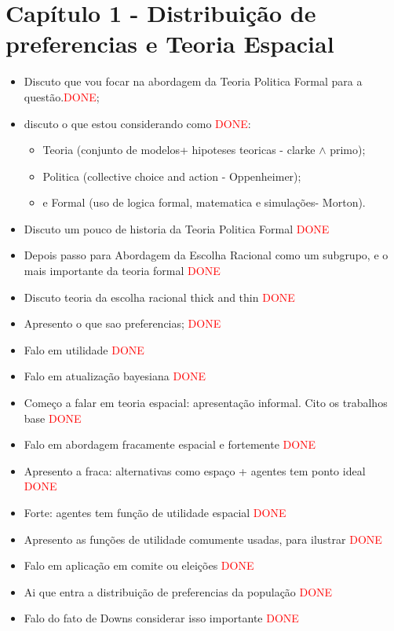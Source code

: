 \documentclass{article}
\begin{document}
\section*{Capítulo 1 - Distribuição de preferencias e Teoria Espacial }
\begin{itemize}
\item Discuto que vou focar na abordagem da Teoria Politica Formal para a
  questão.\textcolor{red}{DONE};
\item discuto o que estou considerando como \textcolor{red}{DONE}:
  \begin{itemize}
  \item Teoria (conjunto de modelos+ hipoteses teoricas - clarke $\land$ primo);
  \item Politica (collective choice and action - Oppenheimer); 
  \item e Formal (uso de logica formal, matematica e simulações- Morton).
\end{itemize}
\item Discuto um pouco de historia da Teoria Politica Formal \textcolor{red}{DONE}
\item Depois  passo para Abordagem da Escolha Racional como um subgrupo, e o
  mais importante da teoria formal \textcolor{red}{DONE}
\item Discuto teoria da escolha racional thick and thin \textcolor{red}{DONE}
\item Apresento o que sao preferencias; \textcolor{red}{DONE}
\item Falo em utilidade \textcolor{red}{DONE}
\item Falo em atualização bayesiana \textcolor{red}{DONE}
\item Começo a falar em teoria espacial: apresentação informal. Cito os
  trabalhos base \textcolor{red}{DONE}
\item Falo em abordagem fracamente espacial e fortemente \textcolor{red}{DONE}
\item Apresento a fraca: alternativas como espaço + agentes tem ponto ideal \textcolor{red}{DONE}
\item Forte: agentes tem função de utilidade espacial \textcolor{red}{DONE}
\item Apresento as funções de utilidade comumente usadas, para ilustrar \textcolor{red}{DONE}
\item Falo em aplicação em comite ou eleições  \textcolor{red}{DONE}
\item Ai que entra a distribuição de preferencias da população \textcolor{red}{DONE}
\item Falo do fato de Downs considerar isso importante \textcolor{red}{DONE}

\end{itemize}
\end{document}
